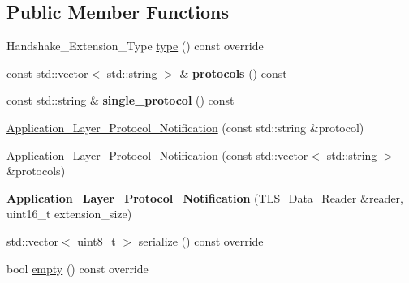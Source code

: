 \subsection*{Public Member Functions}
\begin{DoxyCompactItemize}
\item 
Handshake\+\_\+\+Extension\+\_\+\+Type \hyperlink{class_botan_1_1_t_l_s_1_1_application___layer___protocol___notification_ab60d32531c669dd0d23fdddec69eee17}{type} () const override
\item 
\mbox{\label{class_botan_1_1_t_l_s_1_1_application___layer___protocol___notification_ae88699feca78c6622f85a890b88dbaa2}} 
const std\+::vector$<$ std\+::string $>$ \& {\bfseries protocols} () const
\item 
\mbox{\label{class_botan_1_1_t_l_s_1_1_application___layer___protocol___notification_a8f31130d4944ca4a94a1b26923879b0e}} 
const std\+::string \& {\bfseries single\+\_\+protocol} () const
\item 
\hyperlink{class_botan_1_1_t_l_s_1_1_application___layer___protocol___notification_a9c2deb6b705e0f4cff14fcd80b3211fe}{Application\+\_\+\+Layer\+\_\+\+Protocol\+\_\+\+Notification} (const std\+::string \&protocol)
\item 
\hyperlink{class_botan_1_1_t_l_s_1_1_application___layer___protocol___notification_a510b8c26bf5284ffabb9c1884ead02cf}{Application\+\_\+\+Layer\+\_\+\+Protocol\+\_\+\+Notification} (const std\+::vector$<$ std\+::string $>$ \&protocols)
\item 
\mbox{\label{class_botan_1_1_t_l_s_1_1_application___layer___protocol___notification_a05ec806ab06cdf7aa96582111410d86f}} 
{\bfseries Application\+\_\+\+Layer\+\_\+\+Protocol\+\_\+\+Notification} (T\+L\+S\+\_\+\+Data\+\_\+\+Reader \&reader, uint16\+\_\+t extension\+\_\+size)
\item 
std\+::vector$<$ uint8\+\_\+t $>$ \hyperlink{class_botan_1_1_t_l_s_1_1_application___layer___protocol___notification_a228264ad294e0569398e3e2575bc1e39}{serialize} () const override
\item 
bool \hyperlink{class_botan_1_1_t_l_s_1_1_application___layer___protocol___notification_ab6232ae6d76319a276b698c9cf69d510}{empty} () const override
\end{DoxyCompactItemize}
